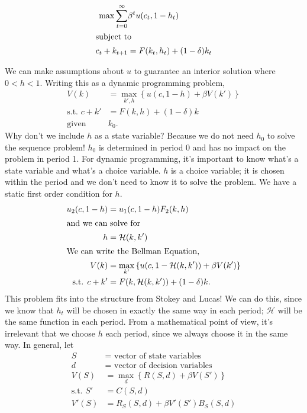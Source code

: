 \documentclass[11pt]{article}
\begin{document}
\begin{align*}
\max \sum^\infty_{t = 0} &\beta^t u(c_t, 1 - h_t)\\
\intertext{subject to}
c_t + k_{t + 1} &= F(k_t, h_t) + (1 - \delta) k_t
\end{align*}

We can make assumptions about \(u\) to guarantee an interior solution where \(0 < h < 1\). Writing this as a dynamic programming problem,
\begin{align*}
V(k) &= \max_{k', h} \left\{u(c, 1 - h) + \beta V(k')\right\}\\
\text{s.t. } c + k' &= F(k, h) + (1 - \delta)k\\
\text{given } &k_0.
\end{align*}
Why don't we include \(h\) as a state variable? Because we do not need \(h_0\) to solve the sequence problem! \(h_0\) is determined in period 0 and has no impact on the problem in period 1. For dynamic programming, it's important to know what's a state variable and what's a choice variable. \(h\) is a choice variable; it is chosen within the period and we don't need to know it to solve the problem. We have a static first order condition for \(h\).
\begin{align*}
u_2(c, 1 - h) &= u_1(c, 1 - h)F_2(k, h)\\
\intertext{and we can solve for}
h &= \mathcal{H}(k, k')\\
\intertext{We can write the Bellman Equation,}
V(k) &= \max_{k'}\left\{u(c, 1 - \mathcal{H}(k, k')) + \beta V(k')\right\}\\
\text{s.t. } c + k' &= F(k, \mathcal{H}(k, k')) + (1 - \delta)k.
\end{align*} 
This problem fits into the structure from Stokey and Lucas! We can do this, since we know that \(h_t\) will be chosen in exactly the same way in each period; \(\mathcal{H}\) will be the same function in each period. From a mathematical point of view, it's irrelevant that we choose \(h\) each period, since we always choose it in the same way. In general, let
\begin{align*}
S &= \text{ vector of state variables} \tag{need to have $s_0$}\\
d &= \text{ vector of decision variables}\\
V(S) &= \max_d \left\{R(S, d) + \beta V(S')\right\}\\
\text{s.t. } S' &= C(S, d)\\
V'(S) &= R_S (S, d) + \beta V'(S') B_S(S, d) \tag{Envelope Condition}
\end{align*}
\end{document}
